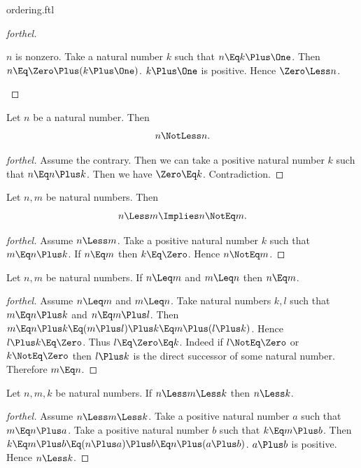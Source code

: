 \documentclass{stex}
\begin{document}
\begin{smodule}{ordering.ftl}
\begin{proof}[forthel]
  \begin{case}{$n$ is nonzero.}
    Take a natural number $k$ such that $n \Eq k \Plus \One$.
    Then $n \Eq \Zero \Plus (k \Plus \One)$.
    $k \Plus \One$ is positive.
    Hence $\Zero \Less n$.
  \end{case}
\end{proof}

\begin{proposition*}[forthel]
  Let $n$ be a natural number.
  Then \[ n \NotLess n. \]
\end{proposition*}
\begin{proof}[forthel]
  Assume the contrary.
  Then we can take a positive natural number $k$ such that $n \Eq n \Plus k$.
  Then we have $\Zero \Eq k$.
  Contradiction.
\end{proof}

\begin{proposition*}[forthel]
  Let $n, m$ be natural numbers.
  Then \[ n \Less m \Implies n \NotEq m. \]
\end{proposition*}
\begin{proof}[forthel]
  Assume $n \Less m$.
  Take a positive natural number $k$ such that $m \Eq n \Plus k$.
  If $n \Eq m$ then $k \Eq \Zero$.
  Hence $n \NotEq m$.
\end{proof}

\begin{proposition*}[forthel]
  Let $n, m$ be natural numbers.
  If $n \Leq m$ and $m \Leq n$ then $n \Eq m$.
\end{proposition*}
\begin{proof}[forthel]
  Assume $n \Leq m$ and $m \Leq n$.
  Take natural numbers $k, l$ such that $m \Eq n \Plus k$ and $n \Eq m \Plus l$.
  Then $m
    \Eq n \Plus k
    \Eq (m \Plus l) \Plus k
    \Eq m \Plus (l \Plus k)$.
  Hence $l \Plus k \Eq \Zero$.
  Thus $l \Eq \Zero \Eq k$.
  Indeed if $l \NotEq \Zero$ or $k \NotEq \Zero$ then $l \Plus k$ is the direct successor of
  some natural number.
  Therefore $m \Eq n$.
\end{proof}

\begin{proposition*}[forthel]
  Let $n, m, k$ be natural numbers.
  If $n \Less m \Less k$ then $n \Less k$.
\end{proposition*}
\begin{proof}[forthel]
  Assume $n \Less m \Less k$.
  Take a positive natural number $a$ such that $m \Eq n \Plus a$.
  Take a positive natural number $b$ such that $k \Eq m \Plus b$.
  Then $k
    \Eq m \Plus b
    \Eq (n \Plus a) \Plus b
    \Eq n \Plus (a \Plus b)$.
  $a \Plus b$ is positive.
  Hence $n \Less k$.
\end{proof}


\end{smodule}
\end{document}

